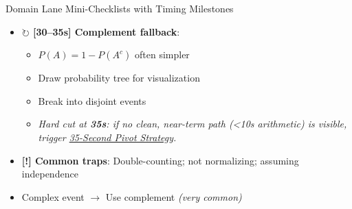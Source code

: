 \documentclass{article}
\newcommand{\timer}[1]{\textbf{\textcolor{timegreen}{#1}}}
\begin{document}
\begin{classifybox}{Domain Lane Mini-Checklists with Timing Milestones}
\begin{itemize}[nosep]
\begin{itemize}[nosep]
        \end{itemize}
      \item \textbf{$\circlearrowright$ [30--35s] Complement fallback}:
        \begin{itemize}[nosep]
        \item $P(A) = 1 - P(A^c)$ often simpler
        \item Draw probability tree for visualization
        \item Break into disjoint events
        \item \emph{Hard cut at \timer{35s}: if no clean, near-term path (<10s arithmetic) is visible, trigger \hyperlink{pivot35}{35-Second Pivot Strategy}.}
        \end{itemize}
      \item \textbf{[!] Common traps}: Double-counting; not normalizing; assuming independence
      \item {} Complex event $\rightarrow$ Use complement \emph{(very common)}
      \end{itemize}
      
      \vspace{3mm}

\end{classifybox}
\end{document}
